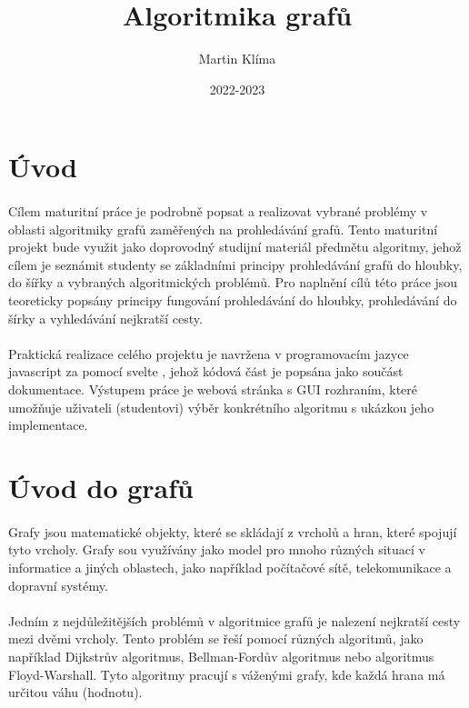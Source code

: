 \documentclass[12pt, titlepage, a4paper]{article}
\title{Algoritmika grafů}
\author{Martin Klíma}
\date{2022-2023}
\begin{document}
\maketitle
\newpage

\tableofcontents
\newpage

\section{Úvod}
\paragraph{}
Cílem maturitní práce je podrobně popsat a realizovat vybrané problémy v oblasti 
algoritmiky grafů zaměřených na prohledávání grafů.
Tento maturitní projekt bude využit jako doprovodný studijní materiál předmětu 
algoritmy, jehož cílem je seznámit studenty se základními principy 
prohledávání grafů do hloubky, do šířky a vybraných algoritmických problémů. 
Pro naplnění cílů této práce jsou teoreticky popsány principy fungování prohledávání do hloubky,
prohledávání do šírky a vyhledávání nejkratší cesty.
\paragraph{}
Praktická realizace celého projektu je navržena v programovacím jazyce javascript za pomocí svelte
, jehož kódová část je popsána jako součást dokumentace. Výstupem práce je webová stránka 
s GUI rozhraním, které umožňuje uživateli (studentovi) výběr konkrétního algoritmu s ukázkou jeho implementace.

\section{Úvod do grafů}
\paragraph{}
Grafy jsou matematické objekty, které se skládají z vrcholů a hran, které spojují tyto 
vrcholy. Grafy sou využívány jako model pro mnoho různých situací v informatice a jiných 
oblastech, jako například počítačové sítě, telekomunikace a dopravní systémy.
\paragraph{}
Jedním z nejdůležitějších problémů v algoritmice grafů je nalezení nejkratší cesty mezi 
dvěmi vrcholy. Tento problém se řeší pomocí různých algoritmů, jako například Dijkstrův 
algoritmus, Bellman-Fordův algoritmus nebo algoritmus Floyd-Warshall. Tyto algoritmy 
pracují s váženými grafy, kde každá hrana má určitou váhu (hodnotu).
\end{document}
